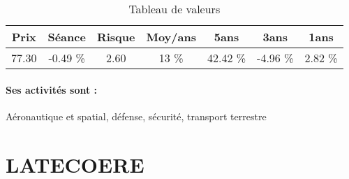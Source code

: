 \documentclass[11pt,a4paper]{report}%
\begin{document}
\begin{table}[H]
  \centering
    \begin{tabular}{|c|c|c|c|c|c|c|}
    \hline
    Prix & Séance & Risque  & Moy/ans & 5ans & 3ans & 1ans \\
    \hline
    77.30 &    -0.49 \%    & 2.60 & 13 \% & 42.42 \% & -4.96 \% & 2.82 \% \\
    \hline
    \end{tabular}%
        \label{tab:table_THALES}%
      \caption{Tableau de valeurs}
\end{table}%

\paragraph{Ses activités sont : } Aéronautique et spatial, défense, sécurité, transport terrestre  
    
    \newpage

\section{LATECOERE}
\end{document}
